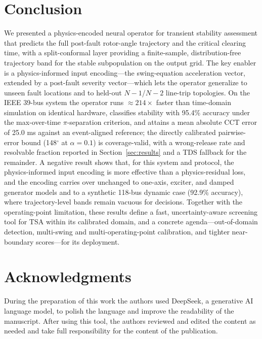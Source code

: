 \documentclass[5p,times]{elsarticle}
\newcommand{\pctACC}{95.4\%}          %
\newcommand{\pctACCb}{92.9\%}         %
\newcommand{\ccterr}{25.0}            %
\newcommand{\pairq}{148}              %
\newcommand{\timSU}{214}              %
\begin{document}
\section{Conclusion}
We presented a physics-encoded neural operator for transient stability assessment that predicts
the full post-fault rotor-angle trajectory and the critical clearing time, with a split-conformal
layer providing a finite-sample, distribution-free trajectory band for the stable subpopulation
on the output grid. The key enabler is a physics-informed input encoding---the swing-equation
acceleration vector, extended by a post-fault severity vector---which lets the operator generalize
to unseen fault locations and to held-out $N{-}1$/$N{-}2$ line-trip topologies. On the IEEE 39-bus
system the operator runs $\approx\timSU{}\times$ faster than time-domain simulation on identical
hardware, classifies stability with \pctACC{} accuracy under the max-over-time $\pi$-separation
criterion, and attains a mean absolute CCT error of \ccterr{} ms against an event-aligned reference; the
directly calibrated pairwise-error bound (\pairq{}$^\circ$ at $\alpha{=}0.1$) is coverage-valid, with a
wrong-release rate and resolvable fraction reported in Section~\ref{sec:results} and a TDS
fallback for the remainder. A negative result shows that, for this system and protocol, the
physics-informed input encoding is more effective than a physics-residual loss, and the encoding
carries over unchanged to one-axis, exciter, and damped generator models and to a synthetic
118-bus dynamic case (\pctACCb{} accuracy), where trajectory-level bands remain vacuous for
decisions. Together with the operating-point limitation, these results define a fast,
uncertainty-aware screening tool for TSA within its calibrated domain, and a concrete
agenda---out-of-domain detection, multi-swing and multi-operating-point calibration, and tighter
near-boundary scores---for its deployment.

\section*{Acknowledgments}
During the preparation of this work the authors used DeepSeek, a generative AI language
model, to polish the language and improve the readability of the manuscript. After using this tool, the
authors reviewed and edited the content as needed and take full responsibility for the content
of the publication.
\end{document}
